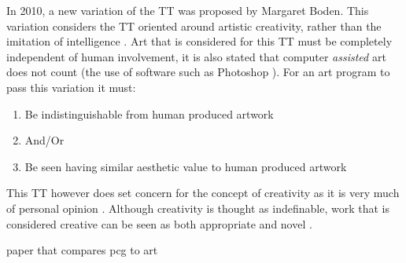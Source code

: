 In 2010, a new variation of the TT was proposed by Margaret Boden. This variation considers the TT oriented around artistic creativity, rather than the imitation of intelligence \cite{artistic-tt}. Art that is considered for this TT must be completely independent of human involvement, it is also stated that computer \textit{assisted} art does not count (the use of software such as Photoshop \cite{photoshop}).
For an art program to pass this variation it must:
\begin{enumerate}
    \item Be indistinguishable from human produced artwork
    \item[]And/Or
    \item Be seen having similar aesthetic value to human produced artwork
\end{enumerate}
This TT however does set concern for the concept of creativity as it is very much of personal opinion \cite{artistic-tt, tt-cc}. Although creativity is thought as indefinable, work that is considered creative can be seen as both appropriate and novel \cite{creativity}.

paper that compares pcg to art \cite{pcg-vs-art}